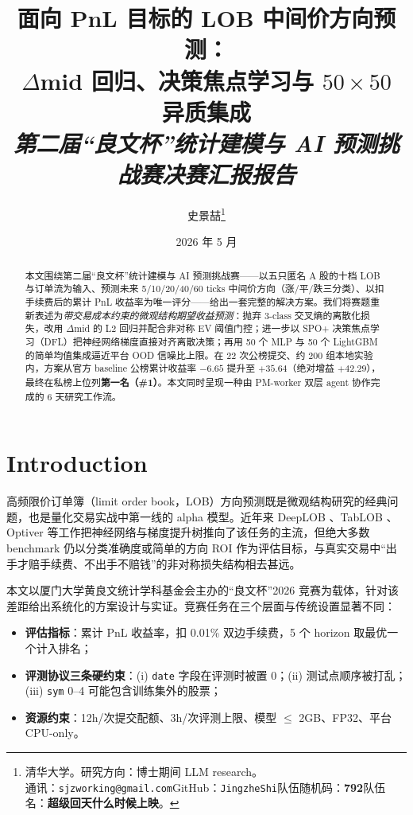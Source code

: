 \documentclass[11pt]{article}
\title{\vspace{-2em}\bfseries\color{icmlblue}\Large 面向 PnL 目标的 LOB 中间价方向预测：\\
$\Delta$mid 回归、决策焦点学习与 $50\times50$ 异质集成\\[2pt]
\normalsize\mdseries\itshape 第二届``良文杯''统计建模与 AI 预测挑战赛决赛汇报报告}
\author{
史景喆\thanks{清华大学。研究方向：博士期间 LLM research。\\
\hspace*{1em}通讯：\texttt{sjzworking@gmail.com}\quad GitHub：\texttt{JingzheShi}\quad 队伍随机码：\textbf{792}\quad 队伍名：\textbf{超级回天什么时候上映}。}
}
\date{2026 年 5 月}
\begin{document}
\maketitle

\vspace{-1.5em}

\begin{abstract}
\noindent
本文围绕第二届``良文杯''统计建模与 AI 预测挑战赛——以五只匿名 A 股的十档 LOB 与订单流为输入、预测未来 5/10/20/40/60 ticks 中间价方向（涨/平/跌三分类）、以扣手续费后的累计 PnL 收益率为唯一评分——给出一套完整的解决方案。我们将赛题重新表述为\emph{带交易成本约束的微观结构期望收益预测}：抛弃 3-class 交叉熵的离散化损失，改用 $\Delta$mid 的 L2 回归并配合非对称 EV 阈值门控；进一步以 SPO+ 决策焦点学习（DFL）把神经网络梯度直接对齐离散决策；再用 50 个 MLP 与 50 个 LightGBM 的简单均值集成逼近平台 OOD 信噪比上限。在 22 次公榜提交、约 200 组本地实验内，方案从官方 baseline 公榜累计收益率 $-6.65$ 提升至 \textbf{$+35.64$}（绝对增益 $+42.29$），最终在私榜上位列\textbf{第一名（\#1）}。本文同时呈现一种由 PM-worker 双层 agent 协作完成的 6 天研究工作流。
\end{abstract}

\section{Introduction}

高频限价订单簿（limit order book，LOB）方向预测既是微观结构研究的经典问题，也是量化交易实战中第一线的 alpha 模型。近年来 DeepLOB \cite{deeplob2019}、TabLOB \cite{tablob}、Optiver \cite{optiver_kaggle} 等工作把神经网络与梯度提升树推向了该任务的主流，但绝大多数 benchmark 仍以分类准确度或简单的方向 ROI 作为评估目标，与真实交易中``出手才赔手续费、不出手不赔钱''的非对称损失结构相去甚远。

本文以厦门大学黄良文统计学科基金会主办的``良文杯''2026 竞赛为载体，针对该差距给出系统化的方案设计与实证。竞赛任务在三个层面与传统设置显著不同：
\begin{itemize}
  \item \textbf{评估指标}：累计 PnL 收益率，扣 0.01\% 双边手续费，5 个 horizon 取最优一个计入排名；
  \item \textbf{评测协议三条硬约束}：(i) \texttt{date} 字段在评测时被置 0；(ii) 测试点顺序被打乱；(iii) \texttt{sym} 0--4 可能包含训练集外的股票；
  \item \textbf{资源约束}：12h/次提交配额、3h/次评测上限、模型 $\le$ 2GB、FP32、平台 CPU-only。
\end{itemize}
\end{document}
